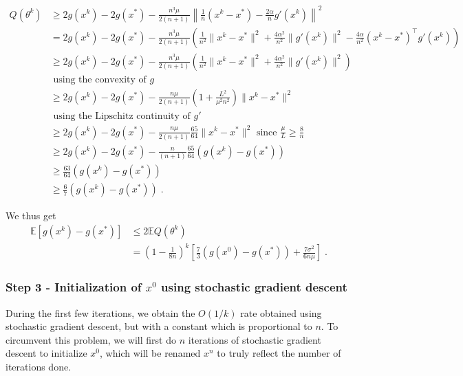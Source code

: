 \documentclass{article}
\def\E{_{\scriptscriptstyle E}}
\def \E{{\mathbb E}}
\def \E{{\mathbb E}}
\begin{document}
\begin{align*}
Q(\theta^k) &\geqslant 2 g(x^k) - 2 g(x^\ast) - \frac{n^3\mu}{2(n+1)} \left\|\frac{1}{n} (x^k - x^\ast) - \frac{2\alpha}{n}g'(x^k)\right\|^2\\
&= 2 g(x^k) - 2 g(x^\ast) - \frac{n^3\mu}{2(n+1)} \left( \frac{1}{n^2} \|x^k - x^\ast\|^2 + \frac{4\alpha^2}{n^2}\|g'(x^k)\|^2 - \frac{4\alpha}{n^2} (x^k - x^\ast)^\top g'(x^k)\right)\\
& \geqslant 2 g(x^k) - 2 g(x^\ast) - \frac{n^3\mu}{2(n+1)} \left( \frac{1}{n^2} \|x^k - x^\ast\|^2 + \frac{4\alpha^2}{n^2}\|g'(x^k)\|^2\right)\\
& \mbox{ using the convexity of } g \\
&\geqslant 2 g(x^k) - 2 g(x^\ast) - \frac{n\mu}{2(n+1)} \left(1 + \frac{L^2}{\mu^2n^2}\right)\|x^k - x^\ast\|^2\\
& \mbox{ using the Lipschitz continuity of } g' \\
&\geqslant 2 g(x^k) - 2 g(x^\ast) - \frac{n\mu}{2(n+1)} \frac{65}{64}\|x^k - x^\ast\|^2 \textrm{ since } \frac{\mu}{L} \geqslant \frac{8}{n}\\
&\geqslant 2 g(x^k) - 2 g(x^\ast) - \frac{n}{(n+1)} \frac{65}{64}(g(x^k) - g(x^\ast))\\
&\geqslant \frac{63}{64}(g(x^k) - g(x^\ast))\\
&\geqslant \frac{6}{7}(g(x^k) - g(x^\ast)) \; .
\end{align*}

We thus get
\begin{align*}
\E\left[g(x^k) - g(x^\ast)\right] 	& \leqslant 2 \E Q(\theta^k)\\
& = \left(1 - \frac{1}{8n}\right)^k \left[\frac{7}{3}(g(x^0) - g(x^\ast)) + \frac{7\sigma^2}{6n\mu}\right] \; .
\end{align*}

\subsubsection*{Step 3 - Initialization of $x^0$ using stochastic gradient descent}
During the first few iterations, we obtain the $O(1/k)$ rate obtained using stochastic gradient descent, but with a constant which is proportional to $n$. To circumvent this problem, we will first do $n$ iterations of stochastic gradient descent to initialize $x^0$, which will be renamed $x^n$ to truly reflect the number of iterations done.
\end{document}
